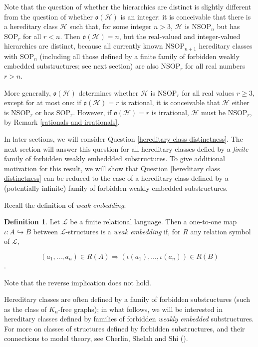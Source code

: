 \documentclass{amsart}
\theoremstyle{definition}
\newtheorem{definition}[theorem]{Definition}
\theoremstyle{remark}
\numberwithin{equation}{section}
\begin{document}
Note that the question of whether the hierarchies are distinct is slightly different from the question of whether $\mathfrak{o}(\mathcal{H})$ is an integer: it is conceivable that there is a hereditary class $\mathcal{H}$ such that, for some integer $n > 3$, $\mathcal{H}$ is $\mathrm{NSOP}_{n}$ but has $\mathrm{SOP}_{r}$ for all $r < n$. Then $\mathfrak{o}(\mathcal{H}) = n$, but the real-valued and integer-valued hierarchies are distinct, because all currently known $\mathrm{NSOP}_{n+1}$ hereditary classes with $\mathrm{SOP}_{n}$ (including all those defined by a finite family of forbidden weakly embedded substructures; see next section) are also $\mathrm{NSOP}_{r}$ for all real numbers $r > n$.

More generally, $\mathfrak{o}(\mathcal{H})$ determines whether $\mathcal{H}$ is $\mathrm{NSOP}_{r}$ for all real values $r \geq 3$, except for at most one: if $\mathfrak{o}(\mathcal{H}) = r $ is rational, it is conceivable that $\mathcal{H}$ either is $\mathrm{NSOP}_{r}$ or has $\mathrm{SOP}_{r}$. However, if $\mathfrak{o}(\mathcal{H}) = r$ is irrational, $\mathcal{H}$ must be $\mathrm{NSOP}_{r}$, by Remark \ref{rationals and irrationals}.

In later sections, we will consider Question \ref{hereditary class distinctness}. The next section will answer this question for all hereditary classes defied by a \textit{finite} family of forbidden weakly embeddded substructures. To give additional motivation for this result, we will show that Question \ref{hereditary class distinctness} can be reduced to the case of a hereditary class defined by a (potentially infinite) family of forbidden weakly embedded substructures.

Recall the definition of \textit{weak embedding}:

\begin{definition}\label{weak embedding}
    Let $\mathcal{L}$ be a finite relational language. Then a one-to-one map $\iota: A \hookrightarrow B$ between $\mathcal{L}$-structures is a \emph{weak embedding} if, for $R$ any relation symbol of $\mathcal{L}$,

    $$(a_{1}, \ldots, a_{n}) \in R(A) \Rightarrow (\iota(a_{1}), \ldots, \iota(a_{n})) \in R(B)$$.

    
\end{definition}


Note that the reverse implication does not hold.

Hereditary classes are often defined by a family of forbidden substructures (such as the class of $K_{n}$-free graphs); in what follows, we will be interested in hereditary classes defined by families of forbidden \textit{weakly embedded} substructures. For more on classes of structures defined by forbidden substructures, and their connections to model theory, see Cherlin, Shelah and Shi (\cite{CSS99}).
\end{document}
